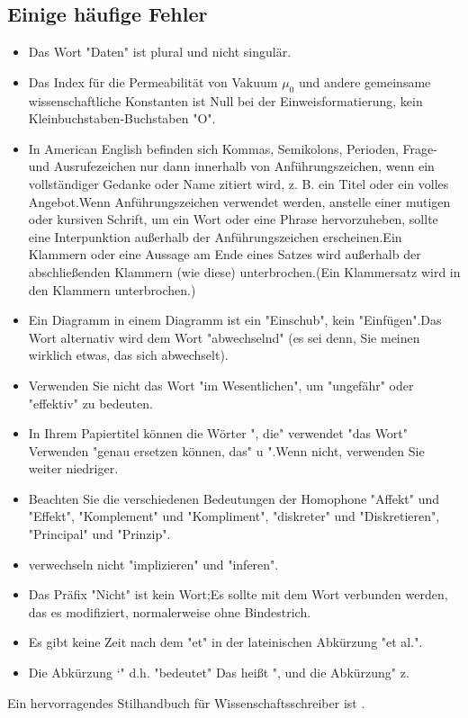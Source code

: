 \documentclass[conference]{IEEEtran}
\begin{document}
\subsection{Einige häufige Fehler} \label{SCM}
\begin{itemize}
\item Das Wort "Daten" ist plural und nicht singulär.
\item Das Index für die Permeabilität von Vakuum $\mu_{0}$ und andere gemeinsame wissenschaftliche Konstanten ist Null bei der Einweisformatierung, kein Kleinbuchstaben-Buchstaben "O".
\item In American English befinden sich Kommas, Semikolons, Perioden, Frage- und Ausrufezeichen nur dann innerhalb von Anführungszeichen, wenn ein vollständiger Gedanke oder Name zitiert wird, z. B. ein Titel oder ein volles Angebot.Wenn Anführungszeichen verwendet werden, anstelle einer mutigen oder kursiven Schrift, um ein Wort oder eine Phrase hervorzuheben, sollte eine Interpunktion außerhalb der Anführungszeichen erscheinen.Ein Klammern oder eine Aussage am Ende eines Satzes wird außerhalb der abschließenden Klammern (wie diese) unterbrochen.(Ein Klammersatz wird in den Klammern unterbrochen.) \item Ein Diagramm in einem Diagramm ist ein "Einschub", kein "Einfügen".Das Wort alternativ wird dem Wort "abwechselnd" (es sei denn, Sie meinen wirklich etwas, das sich abwechselt).
\item Verwenden Sie nicht das Wort "im Wesentlichen", um "ungefähr" oder "effektiv" zu bedeuten.
\item In Ihrem Papiertitel können die Wörter ", die" verwendet "das Wort" Verwenden "genau ersetzen können, das" u ".Wenn nicht, verwenden Sie weiter niedriger.
\item Beachten Sie die verschiedenen Bedeutungen der Homophone "Affekt" und "Effekt", "Komplement" und "Kompliment", "diskreter" und "Diskretieren", "Principal" und "Prinzip".
\item verwechseln nicht "implizieren" und "inferen".
\item Das Präfix "Nicht" ist kein Wort;Es sollte mit dem Wort verbunden werden, das es modifiziert, normalerweise ohne Bindestrich.
\item Es gibt keine Zeit nach dem "et" in der lateinischen Abkürzung "et al.".
\item Die Abkürzung `" d.h. "bedeutet" Das heißt ", und die Abkürzung" z.
\end{itemize}
Ein hervorragendes Stilhandbuch für Wissenschaftsschreiber ist \cite{b7}.
\end{document}
